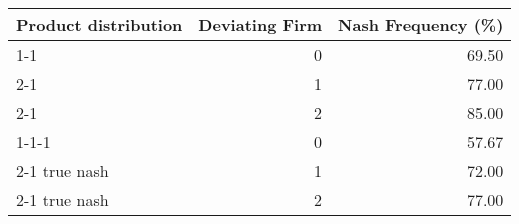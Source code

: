 \begin{tabular}{lrr}
\toprule
Product distribution & Deviating Firm & Nash Frequency (\%) \\
\midrule
1-1 & 0 & 69.50 \\
2-1  & 1 & 77.00 \\
2-1  & 2 & 85.00 \\
1-1-1 & 0 & 57.67 \\
2-1  true nash & 1 & 72.00 \\
2-1  true nash & 2 & 77.00 \\
\bottomrule
\end{tabular}
